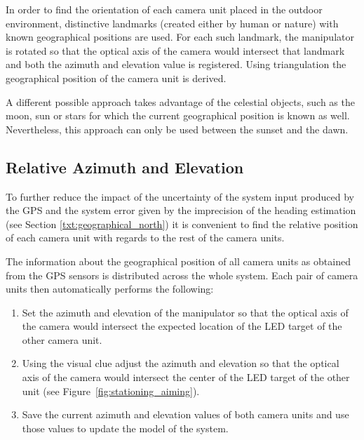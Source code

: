 In order to find the orientation of each camera unit placed in the outdoor environment, distinctive landmarks (created either by human or nature) with known geographical positions are used. For each such landmark, the manipulator is rotated so that the optical axis of the camera would intersect that landmark and both the azimuth and elevation value is registered. Using triangulation the geographical position of the camera unit is derived. 

A different possible approach takes advantage of the celestial objects, such as the moon, sun or stars for which the current geographical position is known as well. Nevertheless, this approach can only be used between the sunset and the dawn.

\subsection{Relative Azimuth and Elevation}

To further reduce the impact of the uncertainty of the system input produced by the GPS and the system error given by the imprecision of the heading estimation (see Section \ref{txt:geographical_north}) it is convenient to find the relative position of each camera unit with regards to the rest of the camera units.

The information about the geographical position of all camera units as obtained from the GPS sensors is distributed across the whole system. Each pair of camera units then automatically performs the following:

\begin{enumerate}
	\item Set the azimuth and elevation of the manipulator so that the optical axis of the camera would intersect the expected location of the LED target of the other camera unit.
	\item Using the visual clue adjust the azimuth and elevation so that the optical axis of the camera would intersect the center of the LED target of the other unit (see Figure~\ref{fig:stationing_aiming}).
	\item Save the current azimuth and elevation values of both camera units and use those values to update the model of the system.
\end{enumerate}


